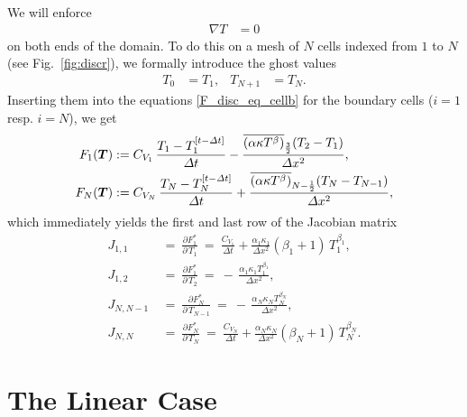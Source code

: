 \documentclass[12pt]{article}
\newcommand{\dx}{\Delta x}
\newcommand{\dt}{\Delta t}
\def\cond{\kappa}
\begin{document}
We will enforce 
\begin{align}
  \nabla T &= 0
\end{align}
on both ends of the domain. To do this on a mesh of $N$ cells indexed from
$1$ to $N$
(see Fig.~\ref{fig:discr}), we formally introduce the ghost values
\begin{align}
  T_0 &= T_1,&   T_{N+1}&=T_N.
\end{align}
Inserting them into the equations \eqref{F_disc_eq_cellb}
for the boundary cells ($i=1$ resp. $i=N$), we get
\begin{subequations}
  \begin{align}
    F_1(\vectorsym{T}) &:= C_{V_1}\,\frac{T_1-T_1^{[t-\dt]}}{\dt}
     - \frac{
       \textstyle{\overline{\left(\alpha\cond T^\beta\right)}}_{\frac{3}{2}}
        ( T_{2}-T_{1}) }{\dx^2} ,
    \\
    F_N(\vectorsym{T}) &:= C_{V_N}\,\frac{T_N-T_N^{[t-\dt]}}{\dt}
     + \frac{
       \textstyle{\overline{\left(\alpha\cond T^\beta\right)}}_{N - \frac{1}{2}}
        ( T_{N}-T_{N-1}) }{\dx^2} ,
\end{align}
\end{subequations}
which immediately yields the first and last row of the Jacobian matrix
\begin{subequations}
  \begin{align}
    J_{1,1}
    &~=~ \frac{\partial F^*_1}{\partial\,T_1}
     ~=~ \frac{C_{V_1}}{\dt}    
        + \frac{\alpha_1 \cond_1}{\dx^2} (\beta_1+1)\,T_{1}^{\beta_1},\\
    J_{1,2}
    &~=~\frac{\partial F^*_1}{\partial\,T_2}
     ~=~ -\,\frac{\alpha_1 \cond_1 T_1^{\beta_1}}{\dx^2},\\
    J_{N,N-1}
    &~=~\frac{\partial F^*_N}{\partial\,T_{N-1}}
     ~=~ -\,\frac{\alpha_N \cond_N T_{N}^{\beta_N}}{\dx^2},\\
    J_{N,N}
    &~=~\frac{\partial F^*_N}{\partial\,T_N}
     ~=~ \frac{C_{V_N}}{\dt}    
        + \frac{\alpha_N \cond_N}{\dx^2} (\beta_N+1)\,T_{N}^{\beta_N}.
\end{align}
\end{subequations}


\section{The Linear Case}
\end{document}
